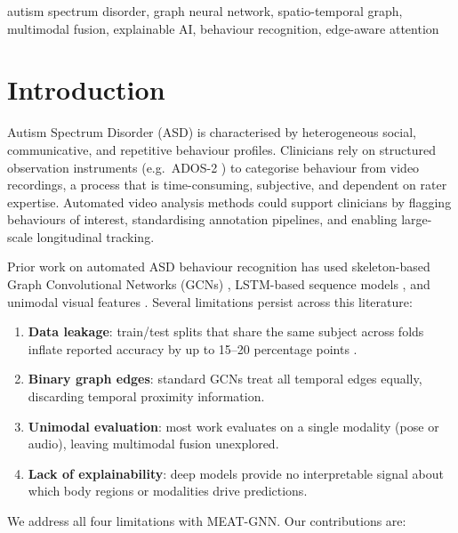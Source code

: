 \documentclass[conference]{IEEEtran}
\begin{document}
\begin{IEEEkeywords}
autism spectrum disorder, graph neural network, spatio-temporal graph, 
multimodal fusion, explainable AI, behaviour recognition, edge-aware attention
\end{IEEEkeywords}

\section{Introduction}

Autism Spectrum Disorder (ASD) is characterised by heterogeneous social, communicative, 
and repetitive behaviour profiles. Clinicians rely on structured observation instruments 
(e.g.\ ADOS-2 \cite{Lord2012}) to categorise behaviour from video recordings, a process 
that is time-consuming, subjective, and dependent on rater expertise. 
Automated video analysis methods could support clinicians by flagging behaviours of 
interest, standardising annotation pipelines, and enabling large-scale longitudinal tracking.

Prior work on automated ASD behaviour recognition has used skeleton-based Graph 
Convolutional Networks (GCNs) \cite{Yan2018}, LSTM-based sequence models 
\cite{Tariq2018}, and unimodal visual features \cite{Rajagopalan2013}. 
Several limitations persist across this literature:

\begin{enumerate}
  \item \textbf{Data leakage}: train/test splits that share the same subject across folds 
        inflate reported accuracy by up to 15–20 percentage points \cite{Zhao2023}.
  \item \textbf{Binary graph edges}: standard GCNs treat all temporal edges equally, 
        discarding temporal proximity information.
  \item \textbf{Unimodal evaluation}: most work evaluates on a single modality 
        (pose or audio), leaving multimodal fusion unexplored.
  \item \textbf{Lack of explainability}: deep models provide no interpretable signal 
        about which body regions or modalities drive predictions.
\end{enumerate}

We address all four limitations with MEAT-GNN. Our contributions are:
\end{document}
